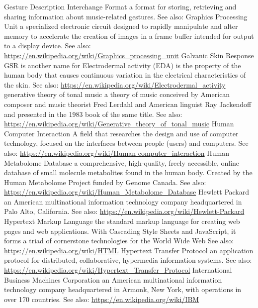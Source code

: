 	{Gesture Description Interchange Format}
	{a format for storing, retrieving and sharing information about music-related gestures. See also: \url{} \cite{Jensenius2006a}}
	{Graphics Processing Unit}
	{a specialized electronic circuit designed to rapidly manipulate and alter memory to accelerate the creation of images in a frame buffer intended for output to a display device.  See also: \url{https://en.wikipedia.org/wiki/Graphics_processing_unit}}
	{Galvanic Skin Response}
	{GSR is another name for Electrodermal activity (EDA) is the property of the human body that causes continuous variation in the electrical characteristics of the skin. See also: \url{https://en.wikipedia.org/wiki/Electrodermal_activity}}
	{generative theory of tonal music}
	{a theory of music conceived by American composer and music theorist Fred Lerdahl and American linguist Ray Jackendoff and presented in the 1983 book of the same title.  See also: \url{https://en.wikipedia.org/wiki/Generative_theory_of_tonal_music} \cite{DBLP:conf/ismir/HamanakaHT14}}
	{Human Computer Interaction}
	{A field that researches the design and use of computer technology, focused on the interfaces between people (users) and computers. See also: \url{https://en.wikipedia.org/wiki/Human-computer_interaction}}
	{Human Metabolome Database}
	{a comprehensive, high-quality, freely accessible, online database of small molecule metabolites found in the human body. Created by the Human Metabolome Project funded by Genome Canada. See also: \url{https://en.wikipedia.org/wiki/Human_Metabolome_Database}}
	{Hewlett Packard}
	{an American multinational information technology company headquartered in Palo Alto, California. See also: \url{https://en.wikipedia.org/wiki/Hewlett-Packard}}
	{Hypertext Markup Language}
	{the standard markup language for creating web pages and web applications. With Cascading Style Sheets and JavaScript, it forms a triad of cornerstone technologies for the World Wide Web See also: \url{https://en.wikipedia.org/wiki/HTML}}
	{Hypertext Transfer Protocol }
	{an application protocol for distributed, collaborative, hypermedia information systems. See also: \url{https://en.wikipedia.org/wiki/Hypertext_Transfer_Protocol}}
	{International Business Machines Corporation}
	{an American multinational information technology company headquartered in Armonk, New York, with operations in over 170 countries. See also: \url{https://en.wikipedia.org/wiki/IBM}}
